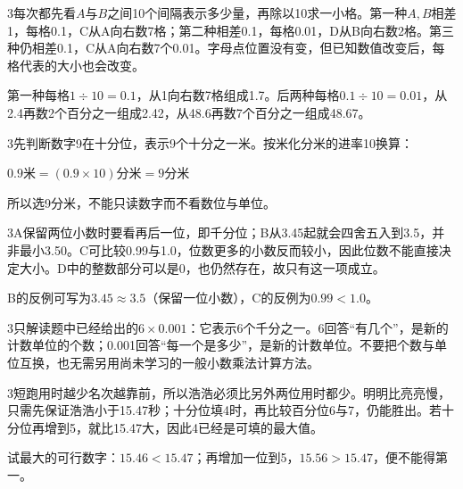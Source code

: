 \documentclass[multi=snippet,border={5bp 20bp 5bp 5bp}]{standalone}
\newenvironment{snippet}[3]{\begin{minipage}{#1bp}\color{answerred}\fontsize{#2}{#3}\selectfont\raggedright}{\end{minipage}}
\begin{document}
\begin{snippet}{505}{11.5}{14}\begin{multicols}{3}\raggedcolumns 每次都先看\(A\)\allowbreak 与\(B\)\allowbreak 之间10个间隔表示多少量，再除以10求一小格。第一种\(A,\allowbreak B\)\allowbreak 相差1，每格0.1，C从A向右数7格；第二种相差0.1，每格0.01，D从B向右数2格。第三种仍相差0.1，C从A向右数7个0.01。字母点位置没有变，但已知数值改变后，每格代表的大小也会改变。\par 第一种每格\(1\div10=0.1\)\allowbreak ，从1向右数7格组成1.7。后两种每格\(0.1\div10=0.01\)\allowbreak ，从2.4再数2个百分之一组成2.42，从48.6再数7个百分之一组成48.67。\end{multicols}\end{snippet}
\begin{snippet}{505}{11.5}{14}\begin{multicols}{3}\raggedcolumns 先判断数字9在十分位，表示9个十分之一米。按米化分米的进率10换算：\par\noindent\(\displaystyle 0.9\text{米}=(0.9\times10)\text{分米}=9\text{分米}\)\allowbreak \par 所以选9分米，不能只读数字而不看数位与单位。\end{multicols}\end{snippet}
\begin{snippet}{505}{11.5}{14}\begin{multicols}{3}\raggedcolumns A保留两位小数时要看再后一位，即千分位；B从3.45起就会四舍五入到3.5，并非最小3.50。C可比较0.99与1.0，位数更多的小数反而较小，因此位数不能直接决定大小。D中的整数部分可以是0，也仍然存在，故只有这一项成立。\par B的反例可写为\(3.45\approx3.5\)\allowbreak （保留一位小数），C的反例为\(0.99<1.0\)\allowbreak 。\end{multicols}\end{snippet}
\begin{snippet}{505}{11.5}{14}\begin{multicols}{3}\raggedcolumns 只解读题中已经给出的\(6\times0.001\)\allowbreak ：它表示6个千分之一。6回答“有几个”，是新的计数单位的个数；0.001回答“每一个是多少”，是新的计数单位。不要把个数与单位互换，也无需另用尚未学习的一般小数乘法计算方法。\end{multicols}\end{snippet}
\begin{snippet}{505}{11.5}{14}\begin{multicols}{3}\raggedcolumns 短跑用时越少名次越靠前，所以浩浩必须比另外两位用时都少。明明比亮亮慢，只需先保证浩浩小于15.47秒；十分位填4时，再比较百分位6与7，仍能胜出。若十分位再增到5，就比15.47大，因此4已经是可填的最大值。\par 试最大的可行数字：\(15.46<15.47\)\allowbreak ；再增加一位到5，\(15.56>15.47\)\allowbreak ，便不能得第一。\end{multicols}\end{snippet}
\end{document}
